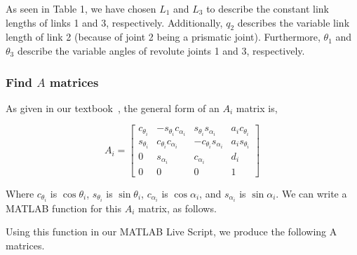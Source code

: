 \documentclass[conference]{IEEEtran}
\begin{document}
\begin{table}[h!]
    \begin{center}
    \end{center}
    \caption{Denavit-Hartenberg table for Problem 3--5}
\end{table}

As seen in Table 1, we have chosen $L_1$ and $L_3$ to describe the constant link
lengths of links 1 and 3, respectively. Additionally, $q_2$ describes the variable
link length of link 2 (because of joint 2 being a prismatic joint).
Furthermore, $\theta_1$ and $\theta_3$ describe the
variable angles of revolute joints 1 and 3, respectively.

\subsubsection{Find $A$ matrices}

As given in our textbook~\cite{Spong2006}, the general form of an
$A_i$ matrix is,

\[
    A_i =
    \begin{bmatrix}
        c_{\theta_i} & -s_{\theta_i}c_{\alpha_i} & s_{\theta_i}s_{\alpha_i} & a_i c_{\theta_i}\\
        s_{\theta_i} & c_{\theta_i}c_{\alpha_i} & -c_{\theta_i}s_{\alpha_i} & a_i s_{\theta_i}\\
        0 & s_{\alpha_i} & c_{\alpha_i} & d_i\\
        0 & 0 & 0 & 1
    \end{bmatrix}
\]

Where $c_{\theta_i}$ is $\cos{\theta_i}$, $s_{\theta_i}$ is $\sin{\theta_i}$,
$c_{\alpha_i}$ is $\cos{\alpha_i}$, and $s_{\alpha_i}$ is $\sin{\alpha_i}$.
We can write a MATLAB function for this $A_i$ matrix, as follows.


Using this function in our MATLAB Live Script, we produce the following A matrices.
\end{document}
